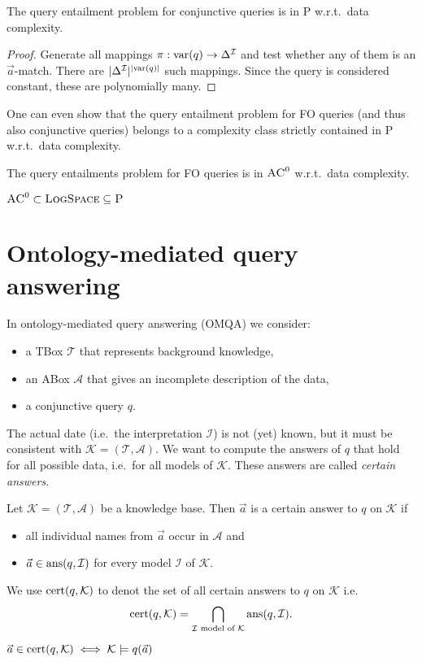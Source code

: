 \begin{prop}
	The query entailment problem for conjunctive queries is in \textsc{P} w.r.t.\ data complexity.
\end{prop}
\begin{proof}
	Generate all mappings $\pi: \operatorname{\text{var}}(q) \to \Delta^{\mathcal{I}}$ 
	and test whether any of them is an $\vec{a}$-match.
	There are $\lvert \Delta^\mathcal{I} \rvert^{\lvert \operatorname{\text{var}}(q) \rvert}$ such mappings.
	Since the query is considered constant, these are polynomially many.
\end{proof}
One can even show that the query entailment problem for FO queries (and thus also conjunctive queries)
belongs to a complexity class strictly contained in \textsc{P} w.r.t.\ data complexity.

\begin{theorem}
	The query entailments problem for FO queries is in $\textsc{AC}^{0}$ w.r.t.\ data complexity.
\end{theorem}
\begin{note}
	$\textsc{AC}^0 \subset \textsc{LogSpace} \subseteq \textsc{P}$
\end{note}

\section{Ontology-mediated query answering}
In ontology-mediated query answering (OMQA) we consider:
\begin{itemize}
	\item a TBox $\mathcal{T}$ that represents background knowledge,
	\item an ABox $\mathcal{A}$ that gives an incomplete description of the data,
	\item a conjunctive query $q$.
\end{itemize}
The actual date (i.e.\ the interpretation $\mathcal{I}$) is not (yet) known,
but it must be consistent with $\mathcal{K} = (\mathcal{T},\mathcal{A})$.
We want to compute the answers of $q$ that hold for all possible data,
i.e.\ for all models of $\mathcal{K}$.
These answers are called \textit{certain answers}.

\begin{definition}
	Let $\mathcal{K} = (\mathcal{T}, \mathcal{A})$ be a knowledge base.
	Then $\vec{a}$ is a certain answer to $q$ on $\mathcal{K}$ if
	\begin{itemize}
		\item all individual names from $\vec{a}$ occur in $\mathcal{A}$ and
		\item $\vec{a} \in \operatorname{\text{ans}}(q,\mathcal{I})$ for every model $\mathcal{I}$ of $\mathcal{K}$.
	\end{itemize}

	We use $\operatorname{\text{cert}}(q, \mathcal{K})$ to denot the set of all certain answers to $q$ on $\mathcal{K}$ i.e.\
	\[
		\operatorname{\text{cert}}(q, \mathcal{K}) = \bigcap_{\mathcal{I} \text{ model of } \mathcal{K}} \operatorname{\text{ans}}(q,\mathcal{I})
	.\]
\end{definition}
\begin{note}
	$\vec{a} \in \func{cert}(q,\mathcal{K}) \iff \mathcal{K} \vDash q(\vec{a})$
\end{note}

